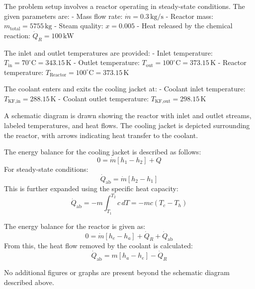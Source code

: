 The problem setup involves a reactor operating in steady-state conditions. The given parameters are:  
- Mass flow rate: \( \dot{m} = 0.3 \, \text{kg/s} \)  
- Reactor mass: \( m_{\text{total}} = 5755 \, \text{kg} \)  
- Steam quality: \( x = 0.005 \)  
- Heat released by the chemical reaction: \( \dot{Q}_R = 100 \, \text{kW} \)  

The inlet and outlet temperatures are provided:  
- Inlet temperature: \( T_{\text{in}} = 70^\circ\text{C} = 343.15 \, \text{K} \)  
- Outlet temperature: \( T_{\text{out}} = 100^\circ\text{C} = 373.15 \, \text{K} \)  
- Reactor temperature: \( T_{\text{Reactor}} = 100^\circ\text{C} = 373.15 \, \text{K} \)  

The coolant enters and exits the cooling jacket at:  
- Coolant inlet temperature: \( T_{\text{KF,in}} = 288.15 \, \text{K} \)  
- Coolant outlet temperature: \( T_{\text{KF,out}} = 298.15 \, \text{K} \)  

A schematic diagram is drawn showing the reactor with inlet and outlet streams, labeled temperatures, and heat flows. The cooling jacket is depicted surrounding the reactor, with arrows indicating heat transfer to the coolant.  

The energy balance for the cooling jacket is described as follows:  
\[
0 = \dot{m} \left[ h_1 - h_2 \right] + Q
\]  
For steady-state conditions:  
\[
\dot{Q}_{\text{ab}} = \dot{m} \left[ h_2 - h_1 \right]
\]  
This is further expanded using the specific heat capacity:  
\[
\dot{Q}_{\text{ab}} = -m \int_{T_1}^{T_2} c \, dT = -m c \left( T_c - T_h \right)
\]  

The energy balance for the reactor is given as:  
\[
0 = \dot{m} \left[ h_e - h_a \right] + \dot{Q}_R + \dot{Q}_{\text{ab}}
\]  
From this, the heat flow removed by the coolant is calculated:  
\[
\dot{Q}_{\text{ab}} = m \left[ h_a - h_e \right] - \dot{Q}_R
\]  

No additional figures or graphs are present beyond the schematic diagram described above.